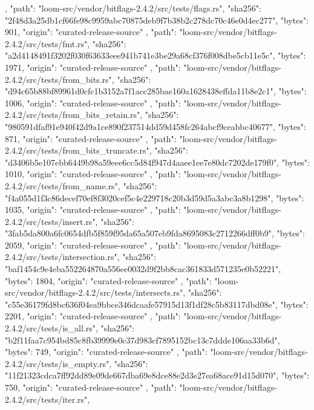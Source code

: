 {{    },
    {
      "path": "loom-src/vendor/bitflags-2.4.2/src/tests/flags.rs",
      "sha256": "2f48d3a25db1cf66fe98c9959abc70875deb9f7b38b2c278dc70c46e0d4ec277",
      "bytes": 901,
      "origin": "curated-release-source"
    },
    {
      "path": "loom-src/vendor/bitflags-2.4.2/src/tests/fmt.rs",
      "sha256": "a2d4148491f3202f030f63633eee941b741e3be29a68cf376f008dbe5cb11e5c",
      "bytes": 1971,
      "origin": "curated-release-source"
    },
    {
      "path": "loom-src/vendor/bitflags-2.4.2/src/tests/from_bits.rs",
      "sha256": "d94c65b88bf89961d0cfc1b3152a7f1acc285bae160a1628438effda11b8e2c1",
      "bytes": 1006,
      "origin": "curated-release-source"
    },
    {
      "path": "loom-src/vendor/bitflags-2.4.2/src/tests/from_bits_retain.rs",
      "sha256": "980591dfaf91e940f42d9a1ce890f237514dd59d458fc264abcf9ceabbc40677",
      "bytes": 871,
      "origin": "curated-release-source"
    },
    {
      "path": "loom-src/vendor/bitflags-2.4.2/src/tests/from_bits_truncate.rs",
      "sha256": "d3406b5e107ebb6449b98a59eee6cc5d84f947d4aaee1ee7e80dc7202de179f0",
      "bytes": 1010,
      "origin": "curated-release-source"
    },
    {
      "path": "loom-src/vendor/bitflags-2.4.2/src/tests/from_name.rs",
      "sha256": "f4a055d1f3c86decef70ef8f3020cef5c4e229718c20b3d59d5a3abc3a8b1298",
      "bytes": 1035,
      "origin": "curated-release-source"
    },
    {
      "path": "loom-src/vendor/bitflags-2.4.2/src/tests/insert.rs",
      "sha256": "3fab5da800a6fc0654dfb5f859f95da65a507eb9fda8695083c2712266dff0b9",
      "bytes": 2059,
      "origin": "curated-release-source"
    },
    {
      "path": "loom-src/vendor/bitflags-2.4.2/src/tests/intersection.rs",
      "sha256": "baf1454c9e4eba552264870a556ee0032d9f2bb8cac361833d571235e0b52221",
      "bytes": 1804,
      "origin": "curated-release-source"
    },
    {
      "path": "loom-src/vendor/bitflags-2.4.2/src/tests/intersects.rs",
      "sha256": "c55e36179fd8bc636f04ea9bbce346dcaafe57915d13f1df28c5b83117dbd08e",
      "bytes": 2201,
      "origin": "curated-release-source"
    },
    {
      "path": "loom-src/vendor/bitflags-2.4.2/src/tests/is_all.rs",
      "sha256": "b2f11faa7c954bd85c8fb39999e0c37d983cf7895152bc13c7ddde106aa33b6d",
      "bytes": 749,
      "origin": "curated-release-source"
    },
    {
      "path": "loom-src/vendor/bitflags-2.4.2/src/tests/is_empty.rs",
      "sha256": "11f21323cdca7ff92dd89e09de667dba69e8dce88e2d3e27ea68ace91d15d070",
      "bytes": 750,
      "origin": "curated-release-source"
    },
    {
      "path": "loom-src/vendor/bitflags-2.4.2/src/tests/iter.rs",
}}
